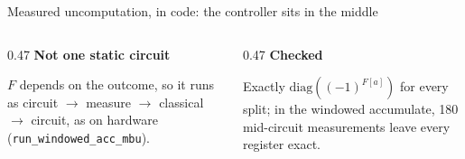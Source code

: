\documentclass[aspectratio=169,11pt]{beamer}
\newcommand{\blocktitle}[1]{{\bfseries #1}\par\vskip1mm}
\newcommand{\code}[2][]{}
\begin{document}
\setcounter{framenumber}{59}
\begin{frame}[fragile]{Measured uncomputation, in code: the controller sits in the middle}
  \code[basicstyle=\ttfamily\footnotesize]{phase_fixup.py}
  \begin{columns}[T]
    \begin{column}{0.47\textwidth}
      \blocktitle{Not one static circuit}
      $F$ depends on the outcome, so it runs as circuit $\to$ measure $\to$ classical $\to$ circuit, as on hardware (\texttt{run\_windowed\_acc\_mbu}).
    \end{column}
    \begin{column}{0.47\textwidth}
      \blocktitle{Checked}
      Exactly $\mathrm{diag}((-1)^{F[a]})$ for every split; in the windowed accumulate, 180 mid-circuit measurements leave every register exact.
    \end{column}
  \end{columns}
\end{frame}
\end{document}

